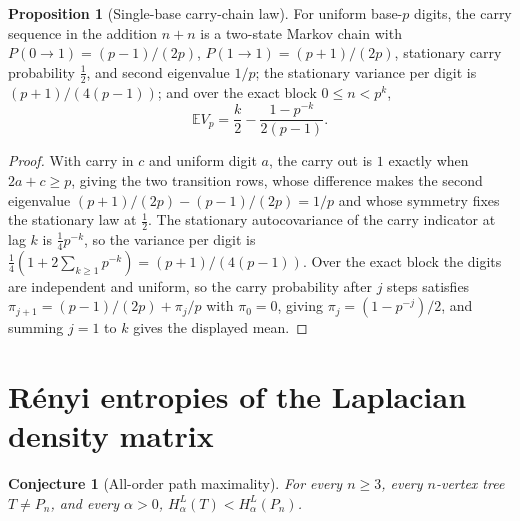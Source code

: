 \documentclass[11pt]{article}
\newtheorem{conjecture}{Conjecture}
\theoremstyle{definition}
\newtheorem{proposition}{Proposition}
\begin{document}
\begin{proposition}[Single-base carry-chain law]\label{ab:carry}
For uniform base-$p$ digits, the carry sequence in the addition $n+n$ is a two-state Markov chain with $P(0\to1)=(p-1)/(2p)$, $P(1\to1)=(p+1)/(2p)$, stationary carry probability $\tfrac12$, and second eigenvalue $1/p$; the stationary variance per digit is $(p+1)/(4(p-1))$; and over the exact block $0\le n<p^k$,
\[
\mathbb EV_p=\frac k2-\frac{1-p^{-k}}{2(p-1)}.
\]
\end{proposition}

\begin{proof}
With carry in $c$ and uniform digit $a$, the carry out is $1$ exactly when $2a+c\ge p$, giving the two transition rows, whose difference makes the second eigenvalue $(p+1)/(2p)-(p-1)/(2p)=1/p$ and whose symmetry fixes the stationary law at $\tfrac12$.  The stationary autocovariance of the carry indicator at lag $k$ is $\tfrac14p^{-k}$, so the variance per digit is $\tfrac14(1+2\sum_{k\ge1}p^{-k})=(p+1)/(4(p-1))$.  Over the exact block the digits are independent and uniform, so the carry probability after $j$ steps satisfies $\pi_{j+1}=(p-1)/(2p)+\pi_j/p$ with $\pi_0=0$, giving $\pi_j=(1-p^{-j})/2$, and summing $j=1$ to $k$ gives the displayed mean.
\end{proof}

\section{R\'enyi entropies of the Laplacian density matrix}

\begin{conjecture}[All-order path maximality]\label{ab1}
For every $n\ge3$, every $n$-vertex tree $T\ne P_n$, and every $\alpha>0$, $H^L_\alpha(T)<H^L_\alpha(P_n)$.
\end{conjecture}
\end{document}
